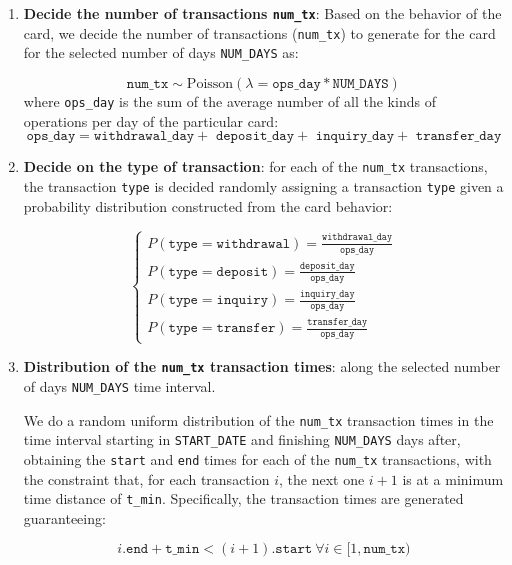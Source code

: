 \documentclass{article}
\begin{document}
\begin{enumerate}
    \item \textbf{Decide the number of transactions \texttt{num\_tx}}:
    Based on the behavior of the card, we decide the number of transactions (\texttt{num\_tx}) to generate for the card for the selected number of days \texttt{NUM\_DAYS} as:

    $$\texttt{num\_tx} \sim \text{Poisson}(\lambda = \texttt{ops\_day} * \texttt{NUM\_DAYS})$$ where \texttt{ops\_day} is the sum of the average number of all the kinds of operations per day of the particular card: 
    $$\texttt{ops\_day} = \texttt{withdrawal\_day} + \texttt{ deposit\_day} + \texttt{ inquiry\_day} + \texttt{ transfer\_day}$$


    \item \textbf{Decide on the type of transaction}: for each of the \texttt{num\_tx} transactions, the transaction \texttt{type} is decided randomly assigning a transaction \texttt{type} given a probability distribution constructed from the card behavior:
    
    $$
    \begin{cases}
      P(\texttt{type} =  \texttt{withdrawal}) = \frac{\texttt{withdrawal\_day}}{\texttt{ops\_day}} \\[8pt]
      P(\texttt{type} =  \texttt{deposit}) = \frac{\texttt{deposit\_day}}{\texttt{ops\_day}} \\[8pt]
      P(\texttt{type} = \texttt{inquiry}) = \frac{\texttt{inquiry\_day}}{\texttt{ops\_day}} \\[8pt]
      P(\texttt{type} =  \texttt{transfer}) = \frac{\texttt{transfer\_day}}{\texttt{ops\_day}} 
    \end{cases}
    $$

    \item \textbf{Distribution of the \texttt{num\_tx} transaction times}: along the selected number of days \texttt{NUM\_DAYS} time interval.
    
    We do a random uniform distribution of the \texttt{num\_tx} transaction times
    in the time interval starting in \texttt{START\_DATE} and finishing \texttt{NUM\_DAYS} days after, obtaining the \texttt{start} and \texttt{end} times for each of the \texttt{num\_tx} transactions, with the constraint that, for each transaction $i$, the next one $i+1$ is at a minimum time distance of \texttt{t\_min}. Specifically, the transaction times are generated guaranteeing:

    $$i.\texttt{end} + \texttt{t\_min} < (i+1).\texttt{start} \ \forall i \in [1,\texttt{num\_tx})$$


\end{enumerate}
\end{document}
